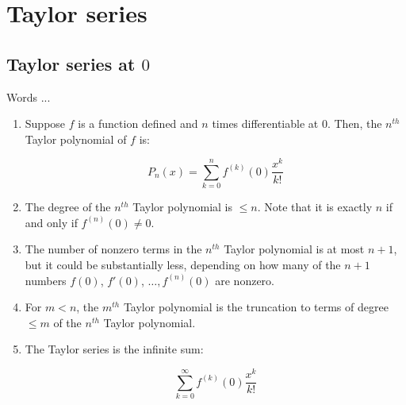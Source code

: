 \documentclass[10pt]{amsart}
\begin{document}
\section{Taylor series}

\subsection{Taylor series at $0$}

Words ...

\begin{enumerate}
\item Suppose $f$ is a function defined and $n$ times differentiable
  at $0$. Then, the $n^{th}$ Taylor polynomial of $f$ is:

  $$P_n(x) = \sum_{k=0}^n f^{(k)}(0) \frac{x^k}{k!}$$

\item The degree of the $n^{th}$ Taylor polynomial is $\le n$. Note
  that it is exactly $n$ if and only if $f^{(n)}(0) \ne 0$.
\item The number of nonzero terms in the $n^{th}$ Taylor polynomial is
  at most $n + 1$, but it could be substantially less, depending on
  how many of the $n + 1$ numbers $f(0)$, $f'(0)$, $\dots, f^{(n)}(0)$
  are nonzero.
\item For $m < n$, the $m^{th}$ Taylor polynomial is the truncation to
  terms of degree $\le m$ of the $n^{th}$ Taylor polynomial.
\item The Taylor series is the infinite sum:

  $$\sum_{k=0}^\infty f^{(k)}(0) \frac{x^k}{k!}$$


\end{enumerate}
\end{document}
